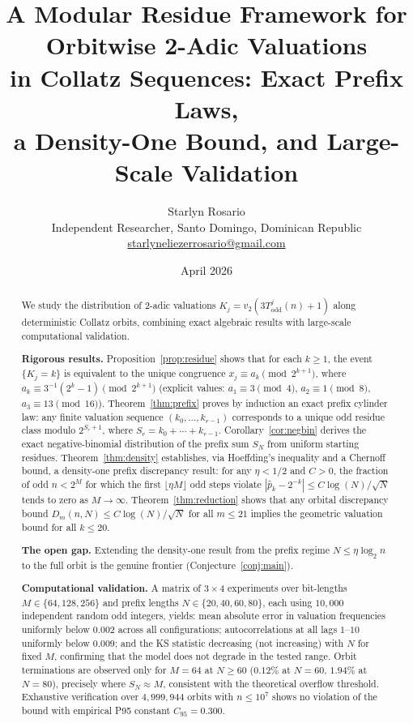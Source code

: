 \documentclass[12pt]{article}
\title{A Modular Residue Framework for Orbitwise 2-Adic Valuations\\
in Collatz Sequences: Exact Prefix Laws,\\
a Density-One Bound, and Large-Scale Validation}
\author{Starlyn Rosario\\
\small Independent Researcher, Santo Domingo, Dominican Republic\\
\small \href{mailto:starlyneliezerrosario@gmail.com}%
      {starlyneliezerrosario@gmail.com}}
\date{April 2026}
\theoremstyle{definition}
\theoremstyle{remark}
\begin{document}
\maketitle

\begin{abstract}
We study the distribution of 2-adic valuations
$K_j = v_2(3T_{\mathrm{odd}}^j(n)+1)$ along deterministic Collatz orbits,
combining exact algebraic results with large-scale computational validation.

\textbf{Rigorous results.}
Proposition~\ref{prop:residue} shows that for each $k\geq 1$, the event
$\{K_j=k\}$ is equivalent to the unique congruence
$x_j\equiv a_k\pmod{2^{k+1}}$,
where $a_k\equiv 3^{-1}(2^k-1)\pmod{2^{k+1}}$
(explicit values: $a_1\equiv 3\pmod{4}$, $a_2\equiv 1\pmod{8}$,
$a_3\equiv 13\pmod{16}$).
Theorem~\ref{thm:prefix} proves by induction an exact prefix cylinder law:
any finite valuation sequence $(k_0,\ldots,k_{r-1})$ corresponds to a unique
odd residue class modulo $2^{S_r+1}$, where $S_r=k_0+\cdots+k_{r-1}$.
Corollary~\ref{cor:negbin} derives the exact negative-binomial distribution
of the prefix sum $S_N$ from uniform starting residues.
Theorem~\ref{thm:density} establishes, via Hoeffding's inequality and a
Chernoff bound, a density-one prefix discrepancy result: for any $\eta<1/2$
and $C>0$, the fraction of odd $n<2^M$ for which the first
$\lfloor\eta M\rfloor$ odd steps violate
$|\hat{p}_k-2^{-k}|\leq C\log(N)/\sqrt{N}$ tends to zero as $M\to\infty$.
Theorem~\ref{thm:reduction} shows that any orbital discrepancy bound
$D_m(n,N)\leq C\log(N)/\sqrt{N}$ for all $m\leq 21$ implies the geometric
valuation bound for all $k\leq 20$.

\textbf{The open gap.}
Extending the density-one result from the prefix regime
$N\leq\eta\log_2 n$ to the full orbit is the genuine frontier
(Conjecture~\ref{conj:main}).

\textbf{Computational validation.}
A matrix of $3\times 4$ experiments over bit-lengths
$M\in\{64,128,256\}$ and prefix lengths $N\in\{20,40,60,80\}$,
each using $10{,}000$ independent random odd integers, yields:
mean absolute error in valuation frequencies uniformly below $0.002$
across all configurations;
autocorrelations at all lags $1$--$10$ uniformly below $0.009$;
and the KS statistic decreasing (not increasing) with $N$ for fixed $M$,
confirming that the model does not degrade in the tested range.
Orbit terminations are observed only for $M=64$ at $N\geq 60$
($0.12\%$ at $N=60$, $1.94\%$ at $N=80$), precisely where
$S_N\approx M$, consistent with the theoretical overflow threshold.
Exhaustive verification over $4{,}999{,}944$ orbits with $n\leq 10^7$
shows no violation of the bound with empirical P95 constant $C_{95}=0.300$.
\end{abstract}
\end{document}
